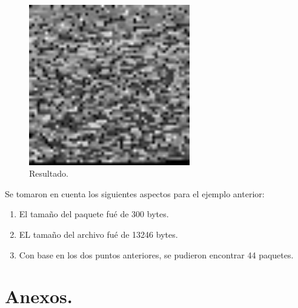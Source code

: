 \documentclass[10pt]{IEEEtran}
\begin{document}
\begin{figure}[H]
\centering
\includegraphics[width=7cm]{final.jpg}
\caption{Resultado.}
\label{ru}
\end{figure}


Se tomaron en cuenta los siguientes aspectos para el ejemplo anterior:

\begin{enumerate}
\item El tamaño del paquete fué de 300 bytes.
\item EL tamaño del archivo fué de 13246 bytes.
\item Con base en los dos puntos anteriores, se pudieron encontrar 44 paquetes.

\end{enumerate}




\onecolumn

\section{Anexos.}
\end{document}
